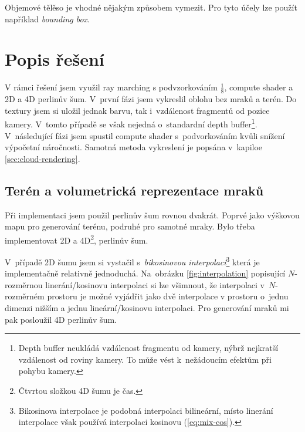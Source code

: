 \documentclass[a4paper, 12pt]{article}
\begin{document}
Objemové tělěso je vhodné nějakým způsobem vymezit. Pro tyto účely
lze použít například \textit{bounding box}.


\section{Popis řešení}

%

V rámci řešení jsem využil ray marching s podvzorkováním $\frac{1}{8}$,
compute shader a 2D a 4D perlinův šum.
V~první fázi jsem vykreslil oblohu bez mraků a terén. Do textury jsem
si uložil jednak barvu, tak i~vzdálenost fragmentů od pozice kamery. V~tomto
případě se však nejedná o~standardní depth buffer\footnote{
Depth buffer neukládá vzdálenost fragmentu od kamery, nýbrž
nejkratší vzdálenost od roviny kamery. To může vést k~nežádoucím efektům
při pohybu kamery.}.
V~následující fázi jsem spustil compute shader s~podvorkováním kvůli snížení
výpočetní náročnosti. Samotná metoda vykreslení je popsána v~kapiloe \ref{sec:cloud-rendering}.

\subsection{Terén a volumetrická reprezentace mraků}

Při implementaci jsem použil perlinův šum rovnou dvakrát.
Poprvé jako výškovou mapu pro generování terénu, podruhé pro samotné mraky.
Bylo třeba implementovat 2D a 4D\footnote{Čtvrtou složkou 4D šumu je čas.},
perlinův šum.

V~případě 2D šumu jsem si vystačil s~\textit{bikosinovou interpolací}\footnote{
Bikosinova interpolace je podobná interpolaci bilineární, místo
linerání interpolace však používá interpolaci kosinovu (\ref{eq:mix-cos}).
}
která je implementačně relativně jednoduchá. Na~obrázku \ref{fig:interpolation}
popisující $N$-rozměrnou linerání/kosinovu interpolaci si lze všimnout,
že interpolaci v~$N$-rozměrném prostoru je možné vyjádřit jako dvě interpolace
v prostoru o~jednu dimenzi nižším a jednu lineární/kosinovu interpolaci.
Pro generování mraků mi pak posloužil 4D perlinův šum.
\end{document}
